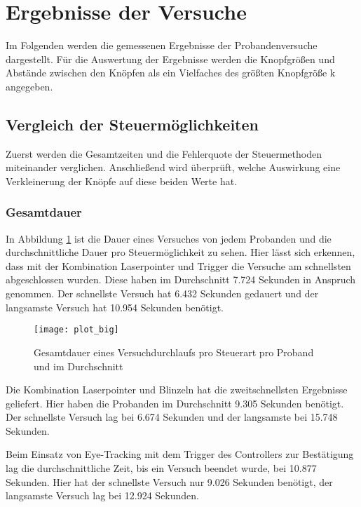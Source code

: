 \section{Ergebnisse der Versuche}
Im Folgenden werden die gemessenen Ergebnisse der Probandenversuche dargestellt. 
Für die Auswertung der Ergebnisse werden die Knopfgrößen und Abstände zwischen den Knöpfen als ein Vielfaches des größten Knopfgröße k angegeben.
\subsection{Vergleich der Steuermöglichkeiten}
Zuerst werden die Gesamtzeiten und die Fehlerquote der Steuermethoden miteinander verglichen. Anschließend wird überprüft, welche Auswirkung eine Verkleinerung der Knöpfe auf diese beiden Werte hat. 
\subsubsection{Gesamtdauer}
In Abbildung \ref{fig:totalTimesBig} ist die Dauer eines Versuches von jedem Probanden und die durchschnittliche Dauer pro Steuermöglichkeit zu sehen. Hier lässt sich erkennen, dass mit der Kombination Laserpointer und Trigger die Versuche am schnellsten abgeschlossen wurden. Diese haben im Durchschnitt 7.724 Sekunden in Anspruch genommen. Der schnellste Versuch hat 6.432 Sekunden gedauert und der langsamste Versuch hat 10.954 Sekunden benötigt.

\begin{figure}[!htbp]
	\centering
	\texttt{[image: plot\_big]}
	\caption[Gesamtdauer eines Versuchdurchlaufs pro Steuerart pro Proband und im Durchschnitt]{Gesamtdauer eines Versuchdurchlaufs pro Steuerart pro Proband und im Durchschnitt}
	\label{fig:totalTimesBig}
\end{figure}

Die Kombination Laserpointer und Blinzeln hat die zweitschnellsten Ergebnisse geliefert. Hier haben die Probanden im Durchschnitt 9.305 Sekunden benötigt. Der schnellste Versuch lag bei 6.674 Sekunden und der langsamste bei 15.748 Sekunden. 

Beim Einsatz von Eye-Tracking mit dem Trigger des Controllers zur Bestätigung lag die durchschnittliche Zeit, bis ein Versuch beendet wurde, bei 10.877 Sekunden. Hier hat der schnellste Versuch nur  9.026 Sekunden benötigt, der langsamste Versuch lag bei 12.924 Sekunden.

